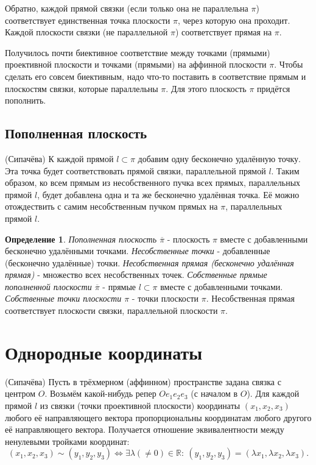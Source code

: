 \documentclass[a4paper, 12pt]{article}
\theoremstyle{definition}
\newtheorem*{definition}{Определение}
\begin{document}
Обратно, каждой прямой связки (если только она не параллельна $\pi$) соответствует единственная точка плоскости $\pi$, через которую она проходит. Каждой плоскости связки (не параллельной $\pi$) соответствует прямая на $\pi$.

Получилось почти биективное соответствие между точками (прямыми) проективной плоскости и точками (прямыми) на аффинной плоскости $\pi$. Чтобы сделать его совсем биективным, надо что-то поставить в соответствие прямым и плоскостям связки, которые параллельны $\pi$. Для этого плоскость $\pi$ придётся пополнить.


\subsection{Пополненная плоскость}
(Сипачёва) К каждой прямой $l \subset \pi$ добавим одну бесконечно удалённую точку. Эта точка будет соответствовать прямой связки, параллельной прямой $l$. Таким образом, ко всем прямым из несобственного пучка всех прямых, параллельных прямой $l$, будет добавлена одна и та же бесконечно удалённая точка. Её можно отождествить с самим несобственным пучком прямых на $\pi$, параллельных прямой $l$.

\begin{definition}
    \textit{Пополненная плоскость $\overline{\pi}$} - плоскость $\pi$ вместе с добавленными бесконечно удалёнными точками. \newline 
    \textit{Несобственные точки} - добавленные (бесконечно удалённые) точки. \newline
    \textit{Несобственная прямая (бесконечно удалённая прямая)} - множество всех несобственных точек. \newline
    \textit{Собственные прямые пополненной плоскости $\overline{\pi}$} - прямые $l \subset \pi$ вместе с добавленными точками. \newline
    \textit{Собственные точки плоскости $\pi$} - точки плоскости $\pi$. Несобственная прямая соответствует плоскости связки, параллельной плоскости $\pi$.
\end{definition}


\section{Однородные координаты}
(Сипачёва) Пусть в трёхмерном (аффинном) пространстве задана связка с центром $O$.
Возьмём какой-нибудь репер $Oe_1e_2e_3$ (с началом в $O$). Для каждой прямой $l$ из связки (точки проективной плоскости) координаты $(x_1, x_2, x_3)$ любого её направляющего вектора пропорциональны координатам любого другого её направляющего вектора.
Получается отношение эквивалентности между ненулевыми тройками координат: \[(x_1, x_2, x_3) \sim (y_1, y_2, y_3) \Leftrightarrow \exists \lambda (\neq 0) \in \mathbb{R}: \ (y_1, y_2, y_3) = (\lambda x_1, \lambda x_2, \lambda x_3). \]
\end{document}
